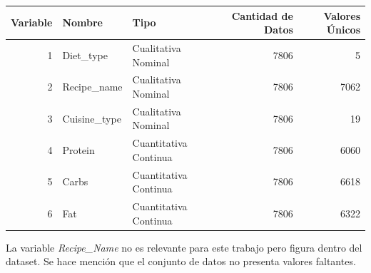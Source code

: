 \documentclass[12pt,a4paper]{article}
\begin{document}
{{            \begin{center}
                \begin{tabular}{r|llrr}
                    \toprule
                    Variable & Nombre & Tipo & Cantidad de Datos & Valores Únicos\\
                    \midrule
                    1 & Diet\_type & Cualitativa Nominal & 7806 & 5 \\
                    2 & Recipe\_name & Cualitativa Nominal & 7806 & 7062\\
                    3 & Cuisine\_type & Cualitativa Nominal & 7806 & 19\\
                    4 & Protein & Cuantitativa Continua & 7806 & 6060\\
                    5 & Carbs & Cuantitativa Continua & 7806 & 6618\\
                    6 & Fat & Cuantitativa Continua & 7806 & 6322\\
                    \bottomrule
                \end{tabular}
            \end{center}
            
            La variable \emph{Recipe\_Name} no es relevante para este trabajo pero figura 
            dentro del dataset. Se hace mención que el conjunto de datos no presenta 
            valores faltantes.
        }
    }

    \newpage
\end{document}
